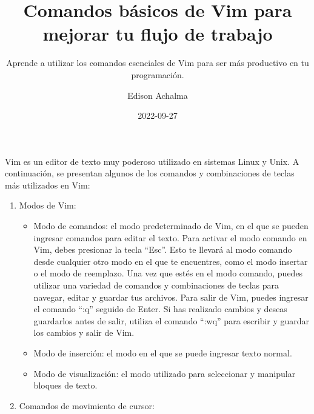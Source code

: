 \documentclass[
  a4paper,
]{article}
\title{Comandos básicos de Vim para mejorar tu flujo de trabajo}
\subtitle{Aprende a utilizar los comandos esenciales de Vim para ser más
productivo en tu programación.}
\author{Edison Achalma}
\date{2022-09-27}
\begin{document}
\maketitle
\ifdefined\Shaded\renewenvironment{Shaded}{\begin{tcolorbox}[breakable, enhanced, frame hidden, sharp corners, interior hidden, boxrule=0pt, borderline west={3pt}{0pt}{shadecolor}]}{\end{tcolorbox}}\fi

Vim es un editor de texto muy poderoso utilizado en sistemas Linux y
Unix. A continuación, se presentan algunos de los comandos y
combinaciones de teclas más utilizados en Vim:

\begin{enumerate}
\def\labelenumi{\arabic{enumi}.}
\item
  Modos de Vim:

  \begin{itemize}
  \item
    Modo de comandos: el modo predeterminado de Vim, en el que se pueden
    ingresar comandos para editar el texto. Para activar el modo comando
    en Vim, debes presionar la tecla ``Esc''. Esto te llevará al modo
    comando desde cualquier otro modo en el que te encuentres, como el
    modo insertar o el modo de reemplazo. Una vez que estés en el modo
    comando, puedes utilizar una variedad de comandos y combinaciones de
    teclas para navegar, editar y guardar tus archivos. Para salir de
    Vim, puedes ingresar el comando ``:q'' seguido de Enter. Si has
    realizado cambios y deseas guardarlos antes de salir, utiliza el
    comando ``:wq'' para escribir y guardar los cambios y salir de Vim.
  \item
    Modo de inserción: el modo en el que se puede ingresar texto normal.
  \item
    Modo de visualización: el modo utilizado para seleccionar y
    manipular bloques de texto.
  \end{itemize}
\item
  Comandos de movimiento de cursor:


\end{enumerate}
\end{document}
